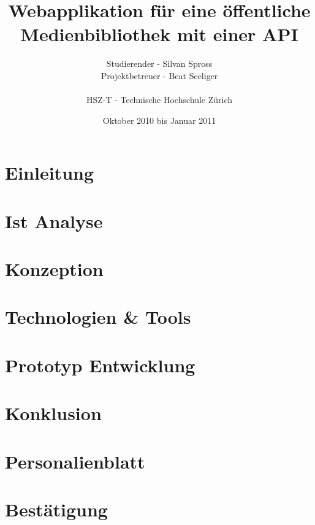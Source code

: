 \documentclass[abstracton,liststotoc,bibtotoc]{scrreprt}
\title{Webapplikation für eine öffentliche Medienbibliothek mit einer API}
\author{Studierender - Silvan Spross\\
    Projektbetreuer - Beat Seeliger\\
    \\
    HSZ-T - Technische Hochschule Zürich}
\date{Oktober 2010 bis Januar 2011}
\begin{document}
    \ifpdf
    \else
    \fi
    

    \maketitle
    
    
    

    \tableofcontents
    
    \clearpage

    \chapter{Einleitung}
    
    
    \chapter{Ist Analyse}
    
    
    \chapter{Konzeption}
    
    
    \chapter{Technologien \& Tools}
    
    
    \chapter{Prototyp Entwicklung}
    
    
    \chapter{Konklusion}
    
    
    \appendix
    
    \chapter{Personalienblatt}
    
    
    \chapter{Bestätigung}
    
    
    \listoffigures

    \listoftables
    
    
    
    
\end{document}
